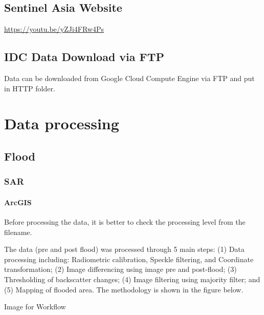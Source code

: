 \documentclass[]{book}
\let\oldparagraph\paragraph
\renewcommand{\paragraph}[1]{\oldparagraph{#1}\mbox{}}
\theoremstyle{definition}
\theoremstyle{definition}
\theoremstyle{definition}
\theoremstyle{remark}
\begin{document}
\subsection{Sentinel Asia Website}\label{sentinel-asia-website}

\url{https://youtu.be/yZJi4FRw4Ps}

\subsection{IDC Data Download via FTP}\label{idc-data-download-via-ftp}

Data can be downloaded from Google Cloud Compute Engine via FTP and put
in HTTP folder.

\section{Data processing}\label{data-processing}

\subsection{Flood}\label{flood}

\subsubsection{SAR}\label{sar}

\paragraph{ArcGIS}\label{arcgis}

Before processing the data, it is better to check the processing level
from the filename.

The data (pre and post flood) was processed through 5 main steps: (1)
Data processing including: Radiometric calibration, Speckle filtering,
and Coordinate transformation; (2) Image differencing using image pre
and post-flood; (3) Thresholding of backscatter changes; (4) Image
filtering using majority filter; and (5) Mapping of flooded area. The
methodology is shown in the figure below.

Image for Workflow
\end{document}
